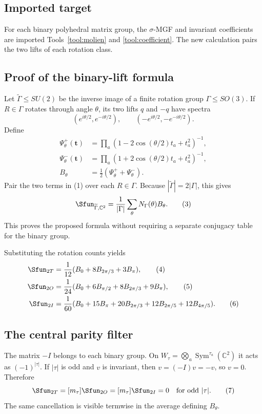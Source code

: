 \documentclass[10pt]{article}
\newcommand{\Sym}{\operatorname{Sym}}
\begin{document}
\subsection{Imported target}
For each binary polyhedral matrix group, the $\sigma$-MGF and invariant
coefficients are imported Tools~\ref{tool:molien} and
\ref{tool:coefficient}. The new calculation pairs the two lifts of each
rotation class.

\subsection{Proof of the binary-lift formula}

Let $\widetilde\Gamma\leq SU(2)$ be the inverse image of a finite rotation
group $\Gamma\leq SO(3)$.  If $R\in\Gamma$ rotates through angle $\theta$,
its two lifts $q$ and $-q$ have spectra
\[
(e^{i\theta/2},e^{-i\theta/2}),\qquad
(-e^{i\theta/2},-e^{-i\theta/2}).
\]
Define
\begin{align*}
\Psi_\theta^+(\mathbf t)&=\prod_a
(1-2\cos(\theta/2)t_a+t_a^2)^{-1},\\
\Psi_\theta^-(\mathbf t)&=\prod_a
(1+2\cos(\theta/2)t_a+t_a^2)^{-1},\\
B_\theta&=\tfrac12(\Psi_\theta^++\Psi_\theta^-).
\end{align*}
Pair the two terms in (1) over each $R\in\Gamma$.  Because
$|\widetilde\Gamma|=2|\Gamma|$, this gives
\begin{equation}
\Sfun_{\widetilde\Gamma,\mathbb C^2}
=\frac1{|\Gamma|}\sum_\theta N_\Gamma(\theta)B_\theta.    \tag{3}
\end{equation}
This proves the proposed formula without requiring a separate conjugacy table
for the binary group.

Substituting the rotation counts yields
\begin{align}
\Sfun_{2T}&=\frac1{12}(B_0+8B_{2\pi/3}+3B_\pi),            \tag{4}\\
\Sfun_{2O}&=\frac1{24}(B_0+6B_{\pi/2}+8B_{2\pi/3}+9B_\pi),\tag{5}\\
\Sfun_{2I}&=\frac1{60}(B_0+15B_\pi+20B_{2\pi/3}
+12B_{2\pi/5}+12B_{4\pi/5}).                              \tag{6}
\end{align}

\subsection{The central parity filter}

The matrix $-I$ belongs to each binary group.  On
$W_\tau=\bigotimes_a\Sym^{\tau_a}(\mathbb C^2)$ it acts as
$(-1)^{|\tau|}$.  If $|\tau|$ is odd and $v$ is invariant, then
$v=(-I)v=-v$, so $v=0$.  Therefore
\begin{equation}
[m_\tau]\Sfun_{2T}=[m_\tau]\Sfun_{2O}=[m_\tau]\Sfun_{2I}=0
\quad\text{for odd }|\tau|.                                \tag{7}
\end{equation}
The same cancellation is visible termwise in the average defining
$B_\theta$.
\end{document}
